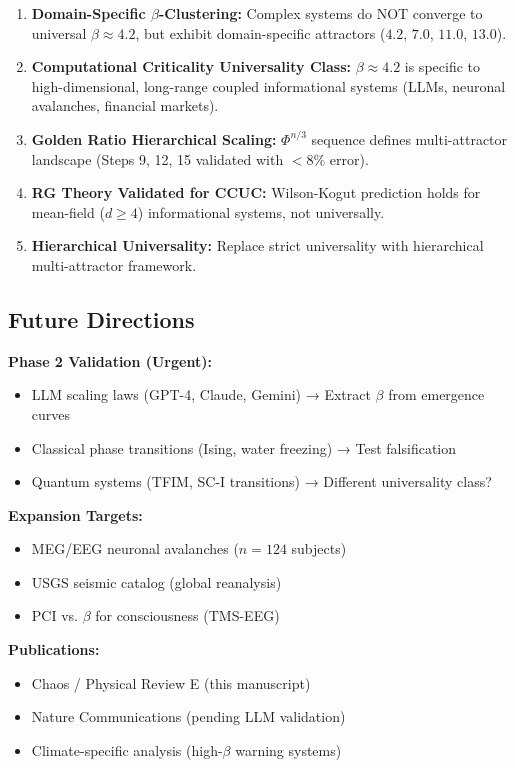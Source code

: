 \documentclass[11pt,a4paper]{article}
\begin{document}
\begin{enumerate}
\item \textbf{Domain-Specific $\beta$-Clustering:} Complex systems do NOT converge to universal $\beta \approx 4.2$, but exhibit domain-specific attractors ($4.2$, $7.0$, $11.0$, $13.0$).

\item \textbf{Computational Criticality Universality Class:} $\beta \approx 4.2$ is specific to high-dimensional, long-range coupled informational systems (LLMs, neuronal avalanches, financial markets).

\item \textbf{Golden Ratio Hierarchical Scaling:} $\Phi^{n/3}$ sequence defines multi-attractor landscape (Steps 9, 12, 15 validated with $< 8\%$ error).

\item \textbf{RG Theory Validated for CCUC:} Wilson-Kogut prediction holds for mean-field ($d \geq 4$) informational systems, not universally.

\item \textbf{Hierarchical Universality:} Replace strict universality with hierarchical multi-attractor framework.
\end{enumerate}

\subsection{Future Directions}

\textbf{Phase 2 Validation (Urgent):}
\begin{itemize}
\item LLM scaling laws (GPT-4, Claude, Gemini) → Extract $\beta$ from emergence curves
\item Classical phase transitions (Ising, water freezing) → Test falsification
\item Quantum systems (TFIM, SC-I transitions) → Different universality class?
\end{itemize}

\textbf{Expansion Targets:}
\begin{itemize}
\item MEG/EEG neuronal avalanches ($n = 124$ subjects)
\item USGS seismic catalog (global reanalysis)
\item PCI vs. $\beta$ for consciousness (TMS-EEG)
\end{itemize}

\textbf{Publications:}
\begin{itemize}
\item Chaos / Physical Review E (this manuscript)
\item Nature Communications (pending LLM validation)
\item Climate-specific analysis (high-$\beta$ warning systems)
\end{itemize}
\end{document}
